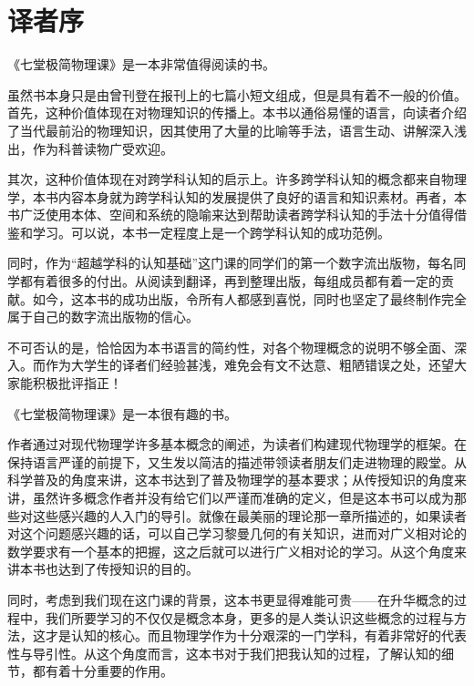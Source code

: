 	\chapter*{译者序}
	\indent

    《七堂极简物理课》是一本非常值得阅读的书。

    虽然书本身只是由曾刊登在报刊上的七篇小短文组成，但是具有着不一般的价值。首先，这种价值体现在对物理知识的传播上。本书以通俗易懂的语言，向读者介绍了当代最前沿的物理知识，因其使用了大量的比喻等手法，语言生动、讲解深入浅出，作为科普读物广受欢迎。

    其次，这种价值体现在对跨学科认知的启示上。许多跨学科认知的概念都来自物理学，本书内容本身就为跨学科认知的发展提供了良好的语言和知识素材。再者，本书广泛使用本体、空间和系统的隐喻来达到帮助读者跨学科认知的手法十分值得借鉴和学习。可以说，本书一定程度上是一个跨学科认知的成功范例。

    同时，作为“超越学科的认知基础”这门课的同学们的第一个数字流出版物，每名同学都有着很多的付出。从阅读到翻译，再到整理出版，每组成员都有着一定的贡献。如今，这本书的成功出版，令所有人都感到喜悦，同时也坚定了最终制作完全属于自己的数字流出版物的信心。

    不可否认的是，恰恰因为本书语言的简约性，对各个物理概念的说明不够全面、深入。而作为大学生的译者们经验甚浅，难免会有文不达意、粗陋错误之处，还望大家能积极批评指正！

   《七堂极简物理课》是一本很有趣的书。

    作者通过对现代物理学许多基本概念的阐述，为读者们构建现代物理学的框架。在保持语言严谨的前提下，又生发以简洁的描述带领读者朋友们走进物理的殿堂。从科学普及的角度来讲，这本书达到了普及物理学的基本要求；从传授知识的角度来讲，虽然许多概念作者并没有给它们以严谨而准确的定义，但是这本书可以成为那些对这些感兴趣的人入门的导引。就像在最美丽的理论那一章所描述的，如果读者对这个问题感兴趣的话，可以自己学习黎曼几何的有关知识，进而对广义相对论的数学要求有一个基本的把握，这之后就可以进行广义相对论的学习。从这个角度来讲本书也达到了传授知识的目的。

    同时，考虑到我们现在这门课的背景，这本书更显得难能可贵——在升华概念的过程中，我们所要学习的不仅仅是概念本身，更多的是人类认识这些概念的过程与方法，这才是认知的核心。而且物理学作为十分艰深的一门学科，有着非常好的代表性与导引性。从这个角度而言，这本书对于我们把我认知的过程，了解认知的细节，都有着十分重要的作用。

	\noindent